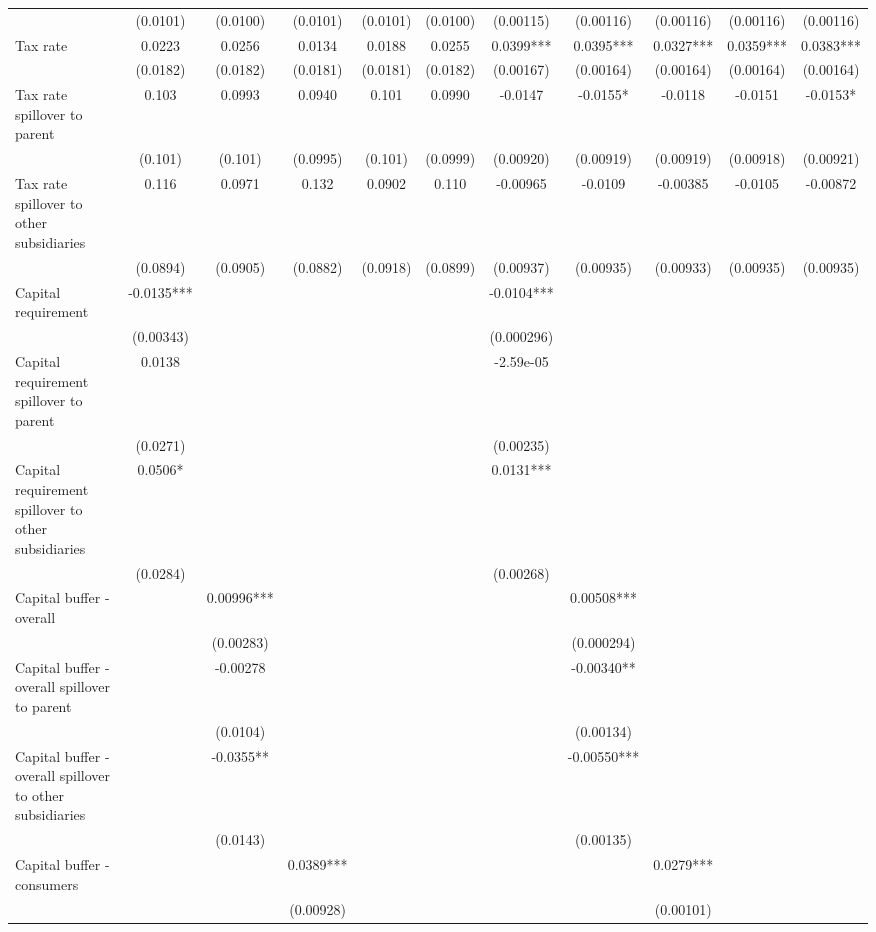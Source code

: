 \begin{tabular}{lcccccccccc}
 & (0.0101) & (0.0100) & (0.0101) & (0.0101) & (0.0100) & (0.00115) & (0.00116) & (0.00116) & (0.00116) & (0.00116) \\
Tax rate & 0.0223 & 0.0256 & 0.0134 & 0.0188 & 0.0255 & 0.0399*** & 0.0395*** & 0.0327*** & 0.0359*** & 0.0383*** \\
 & (0.0182) & (0.0182) & (0.0181) & (0.0181) & (0.0182) & (0.00167) & (0.00164) & (0.00164) & (0.00164) & (0.00164) \\
Tax rate spillover to parent & 0.103 & 0.0993 & 0.0940 & 0.101 & 0.0990 & -0.0147 & -0.0155* & -0.0118 & -0.0151 & -0.0153* \\
 & (0.101) & (0.101) & (0.0995) & (0.101) & (0.0999) & (0.00920) & (0.00919) & (0.00919) & (0.00918) & (0.00921) \\
Tax rate spillover to other subsidiaries & 0.116 & 0.0971 & 0.132 & 0.0902 & 0.110 & -0.00965 & -0.0109 & -0.00385 & -0.0105 & -0.00872 \\
 & (0.0894) & (0.0905) & (0.0882) & (0.0918) & (0.0899) & (0.00937) & (0.00935) & (0.00933) & (0.00935) & (0.00935) \\
Capital requirement & -0.0135*** &  &  &  &  & -0.0104*** &  &  &  &  \\
 & (0.00343) &  &  &  &  & (0.000296) &  &  &  &  \\
Capital requirement spillover to parent & 0.0138 &  &  &  &  & -2.59e-05 &  &  &  &  \\
 & (0.0271) &  &  &  &  & (0.00235) &  &  &  &  \\
Capital requirement spillover to other subsidiaries & 0.0506* &  &  &  &  & 0.0131*** &  &  &  &  \\
 & (0.0284) &  &  &  &  & (0.00268) &  &  &  &  \\
Capital buffer - overall &  & 0.00996*** &  &  &  &  & 0.00508*** &  &  &  \\
 &  & (0.00283) &  &  &  &  & (0.000294) &  &  &  \\
Capital buffer - overall spillover to parent &  & -0.00278 &  &  &  &  & -0.00340** &  &  &  \\
 &  & (0.0104) &  &  &  &  & (0.00134) &  &  &  \\
Capital buffer - overall spillover to other subsidiaries &  & -0.0355** &  &  &  &  & -0.00550*** &  &  &  \\
 &  & (0.0143) &  &  &  &  & (0.00135) &  &  &  \\
Capital buffer - consumers &  &  & 0.0389*** &  &  &  &  & 0.0279*** &  &  \\
 &  &  & (0.00928) &  &  &  &  & (0.00101) &  &  \\

\end{tabular}
